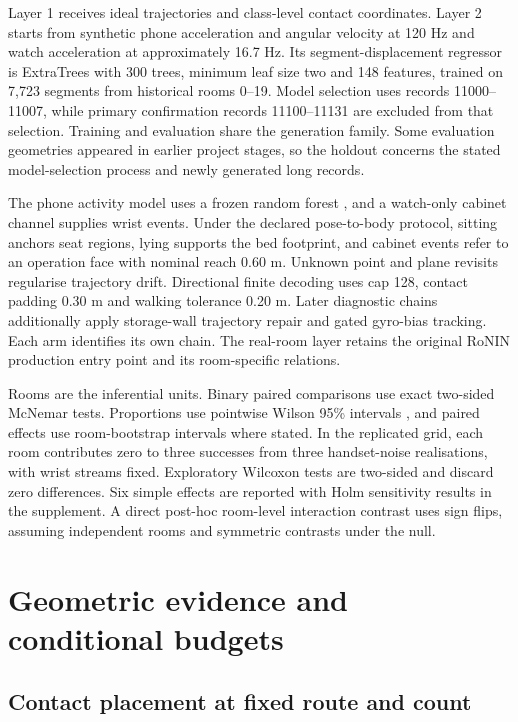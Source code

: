 \documentclass[10pt,twocolumn,letterpaper]{article}
\begin{document}
Layer 1 receives ideal trajectories and class-level contact coordinates.
Layer 2 starts from synthetic phone acceleration and angular velocity at
120 Hz and watch acceleration at approximately 16.7 Hz. Its
segment-displacement regressor is ExtraTrees \cite{r10} with 300 trees,
minimum leaf size two and 148 features, trained on 7,723 segments from
historical rooms 0--19. Model selection uses records 11000--11007, while
primary confirmation records 11100--11131 are excluded from that
selection. Training and evaluation share the generation family. Some
evaluation geometries appeared in earlier project stages, so the holdout
concerns the stated model-selection process and newly generated long
records.

The phone activity model uses a frozen random forest \cite{r9}, and a
watch-only cabinet channel supplies wrist events. Under the declared
pose-to-body protocol, sitting anchors seat regions, lying supports the
bed footprint, and cabinet events refer to an operation face with
nominal reach 0.60 m. Unknown point and plane revisits regularise
trajectory drift. Directional finite decoding uses cap 128, contact
padding 0.30 m and walking tolerance 0.20 m. Later diagnostic chains
additionally apply storage-wall trajectory repair and gated gyro-bias
tracking. Each arm identifies its own chain. The real-room layer retains
the original RoNIN production entry point and its room-specific
relations.

Rooms are the inferential units. Binary paired comparisons use exact
two-sided McNemar tests. Proportions use pointwise Wilson 95\% intervals
\cite{r11}, and paired effects use room-bootstrap intervals where
stated. In the replicated grid, each room contributes zero to three
successes from three handset-noise realisations, with wrist streams
fixed. Exploratory Wilcoxon tests are two-sided and discard zero
differences. Six simple effects are reported with Holm sensitivity
results in the supplement. A direct post-hoc room-level interaction
contrast uses sign flips, assuming independent rooms and symmetric
contrasts under the null.

\section{Geometric evidence and conditional
budgets}\label{geometric-evidence-and-conditional-budgets}

\subsection{Contact placement at fixed route and
count}\label{contact-placement-at-fixed-route-and-count}
\end{document}

